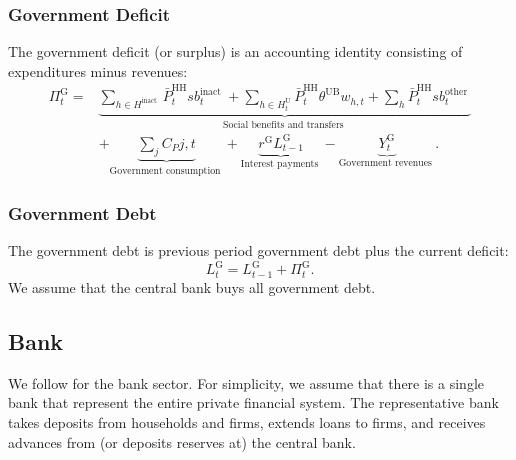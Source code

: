 \subsubsection{Government Deficit}
The government deficit (or surplus) is an accounting identity consisting of expenditures minus revenues:
\begin{equation}
\begin{aligned}
\Pi^{\mathrm{G}}_t= & \underbrace{\sum_{h \in H^{\text {inact }}} \bar{P}^{\mathrm{HH}}_t s b^{\text {inact }}_t+\sum_{h \in H^{\mathrm{U}}_t} \bar{P}^{\mathrm{HH}}_t \theta^{\mathrm{UB}} w_{h,t}+\sum_h \bar{P}^{\mathrm{HH}}_t s b_t^{\text {other }}}_{\text {Social benefits and transfers }} \\
& +\underbrace{\sum_j C_P{j,t}}_{\text {Government consumption }}+\underbrace{r^{\mathrm{G}} L_{t-1}^{\mathrm{G}}}_{\text {Interest payments }}-\underbrace{Y_t^{\mathrm{G}}}_{\text {Government revenues }} .
\end{aligned}
\end{equation}
\subsubsection{Government Debt}
The government debt is previous period government debt plus the current deficit:
\begin{equation}
    L^{\mathrm{G}}_t=L^{\mathrm{G}}_{t-1}+\Pi^{\mathrm{G}}_t.
\end{equation}
We assume that the central bank buys all government debt.
\subsection{Bank}
We follow \cite{poledna_economic_2019} for the bank sector. For simplicity, we assume that there is a single bank that represent the entire private financial system. The representative bank takes deposits from households and firms, extends loans to firms, and receives advances from (or deposits reserves at) the central bank.
